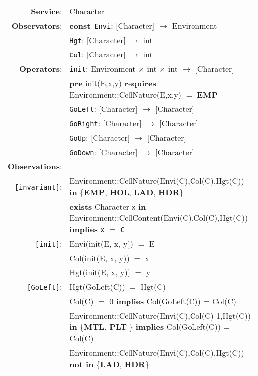 \documentclass[8pt]{article}
\begin{document}
{\small
\begin{longtable}{rl}
  \textbf{Service}: & \textrm{Character}  \\
  \textbf{Observators}: & \textbf{const}~\texttt{Envi}: \textrm{[Character]} $\rightarrow$ \textrm{Environment}  \\
  & \texttt{Hgt}: \textrm{[Character]} $\rightarrow$ \textrm{int}  \\
  & \texttt{Col}: \textrm{[Character]} $\rightarrow$ \textrm{int}  \\
  \textbf{Operators}: & \texttt{init}: \textrm{Environment} $\times$ \textrm{int} $\times$ \textrm{int} $\rightarrow$ \textrm{[Character]} \\
  & \quad\textbf{pre} \textrm{init(E,x,y)} \textbf{requires} \textrm{Environment::CellNature(E,x,y)} $=$ \textbf{EMP} \\
  & \texttt{GoLeft}: \textrm{[Character]} $\rightarrow$ \textrm{[Character]} \\
  & \texttt{GoRight}: \textrm{[Character]} $\rightarrow$ \textrm{[Character]} \\
  & \texttt{GoUp}: \textrm{[Character]} $\rightarrow$ \textrm{[Character]} \\
  & \texttt{GoDown}: \textrm{[Character]} $\rightarrow$ \textrm{[Character]} \\
  \textbf{Observations}: \\
  \texttt{[invariant]}: & \textrm{Environment::CellNature(Envi(C),Col(C),Hgt(C))} \textbf{in} \{\textbf{EMP}, \textbf{HOL}, \textbf{LAD}, \textbf{HDR}\} \\
  & \textbf{exists} \textrm{Character} \texttt{x} \textbf{in} \textrm{Environment::CellContent(Envi(C),Col(C),Hgt(C))} \textbf{implies} \texttt{x} $=$ \texttt{C}  \\
  \texttt{[init]}: & \textrm{Envi(init(E, x, y))} $=$ \textrm{E} \\
  & \textrm{Col(init(E, x, y))} $=$ \textrm{x} \\
  & \textrm{Hgt(init(E, x, y))} $=$ \textrm{y} \\
  \texttt{[GoLeft]}: & \textrm{Hgt(GoLeft(C))} $=$ \textrm{Hgt(C)} \\
  & \textrm{Col(C)} $=$ 0 \textbf{implies} \textrm{Col(GoLeft(C))} = \textrm{Col(C)} \\
  & \textrm{Environment::CellNature(Envi(C),Col(C)-1,Hgt(C))} \textbf{in} \{\textbf{MTL}, \textbf{PLT} \} \textbf{implies} \textrm{Col(GoLeft(C))} = \textrm{Col(C)} \\
  & \textrm{Environment::CellNature(Envi(C),Col(C),Hgt(C))} \textbf{not in} \{\textbf{LAD}, \textbf{HDR}\}

\end{longtable}}
\end{document}
